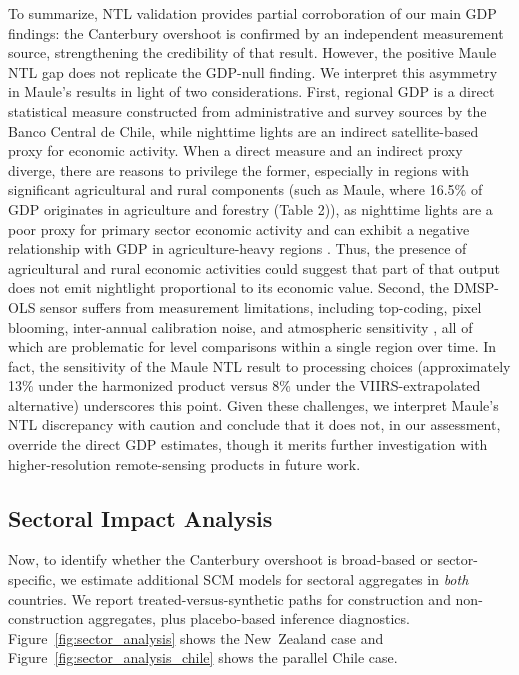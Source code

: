 \documentclass[12pt]{article}
\begin{document}
To summarize, NTL validation provides partial corroboration of our main GDP findings: the Canterbury overshoot is confirmed by an independent measurement source, strengthening the credibility of that result. However, the positive Maule NTL gap does not replicate the GDP-null finding. We interpret this asymmetry in Maule's results in light of two considerations. First, regional GDP is a direct statistical measure constructed from administrative and survey sources by the Banco Central de Chile, while nighttime lights are an indirect satellite-based proxy for economic activity. When a direct measure and an indirect proxy diverge, there are reasons to privilege the former, especially in regions with significant agricultural and rural components (such as Maule, where 16.5\% of GDP originates in agriculture and forestry (Table 2)), as nighttime lights are a poor proxy for primary sector economic activity and can exhibit a negative relationship with GDP in agriculture-heavy regions \parencite{gibson2021night}. Thus, the presence of agricultural and rural economic activities could suggest that part of that output does not emit nightlight proportional to its economic value. Second, the DMSP-OLS sensor suffers from measurement limitations, including top-coding, pixel blooming, inter-annual calibration noise, and atmospheric sensitivity \parencite{gibson2021night}, all of which are problematic for level comparisons within a single region over time. In fact, the sensitivity of the Maule NTL result to processing choices (approximately 13\% under the harmonized product versus 8\% under the VIIRS-extrapolated alternative) underscores this point. Given these challenges, we interpret Maule's NTL discrepancy with caution and conclude that it does not, in our assessment, override the direct GDP estimates, though it merits further investigation with higher-resolution remote-sensing products in future work.

\subsection{Sectoral Impact Analysis}
Now, to identify whether the Canterbury overshoot is broad-based or sector-specific, we estimate additional SCM models for sectoral aggregates in \emph{both} countries. We report treated-versus-synthetic paths for construction and non-construction aggregates, plus placebo-based inference diagnostics. Figure~\ref{fig:sector_analysis} shows the New~Zealand case and Figure~\ref{fig:sector_analysis_chile} shows the parallel Chile case.
\end{document}
